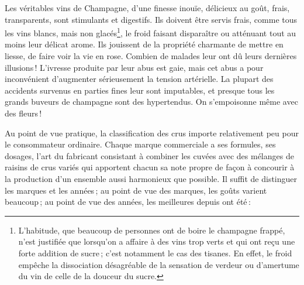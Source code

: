 Les véritables vins de Champagne, d'une finesse inouïe, délicieux au goût,
frais, transparents, sont stimulants et digestifs. Ils doivent être servis
frais, comme tous les vins blancs, mais non glacés\footnote{L'habitude, que
beaucoup de personnes ont de boire le champagne frappé, n'est justifiée que
lorsqu'on a affaire à des vins trop verts et qui ont reçu une forte addition de
sucre ; c'est notamment le cas des tisanes. En effet, le froid empêche la
dissociation désagréable de la sensation de verdeur ou d'amertume du vin de
celle de la douceur du sucre.}, le froid faisant disparaître ou atténuant tout
au moins leur délicat arome. Ils jouissent de la propriété charmante de mettre
en liesse, de faire voir la vie en rose. Combien de malades leur ont dû leurs
dernières illusions ! L'ivresse produite par leur abus est gaie, mais cet abus
a pour inconvénient d'augmenter sérieusement la tension artérielle. La plupart
des accidents survenus en parties fines leur sont imputables, et presque tous
les grands buveurs de champagne sont des hypertendus. On s'empoisonne même avec
des fleurs !

Au point de vue pratique, la classification des crus importe relativement peu
pour le consommateur ordinaire. Chaque marque commerciale a ses formules, ses
dosages, l'art du fabricant consistant à combiner les cuvées avec des mélanges
de raisins de crus variés qui apportent chacun sa note propre de façon
à concourir à la production d’un ensemble aussi harmonieux que possible. Il
suffit de distinguer les marques et les années ; au point de vue des marques,
les goûts varient beaucoup ; au point de vue des années, les meilleures depuis
{\mmm} ont été :

